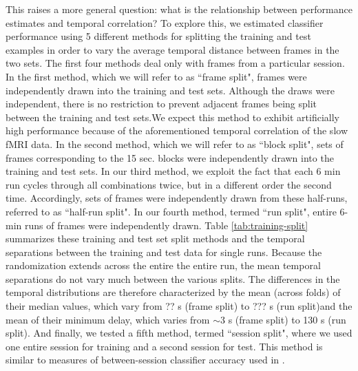 \documentclass[preprint,5p,authoryear]{elsarticle}
\begin{document}
This raises a more general question: what is the relationship between performance estimates and temporal correlation?
To explore this, we estimated classifier performance using 5 different methods for splitting the training and test examples in order to vary the average temporal distance between frames in the two sets. 
The first four methods deal only with frames from a particular session.
In the first method, which we will refer to as  ``frame split", frames were independently drawn into the training and test sets. 
Although the draws were independent, there is no restriction to prevent adjacent frames being split between the training and test sets.We expect this method to exhibit artificially high performance because of the aforementioned temporal correlation of the slow fMRI data.
In the second method, which we will refer to as ``block split", sets of frames corresponding to the 15 sec. blocks were independently drawn into the training and test sets.
In our third method, we exploit the fact that each 6 min run cycles through all combinations twice, but in a different order the second time.
Accordingly, sets of frames were independently drawn from these half-runs, referred to as ``half-run split". 
In our fourth method, termed ``run split", entire 6-min runs of frames were independently drawn. 
Table \ref{tab:training-split} summarizes these training and test set split methods and the temporal separations between the training and test data for single runs. Because the randomization extends across the entire the entire run, the mean temporal separations do not vary much between the various splits. The differences in the temporal distributions are therefore characterized by the mean (across folds) of their median values, which vary from ?? s (frame split) to ??? s (run split)and the mean of their minimum delay, which varies from $\sim$3 s (frame split) to 130 s (run split).
And finally, we tested a fifth method, termed ``session split", where we used one entire session for training and a second session for test.
This method is similar to measures of between-session classifier accuracy used in \citep{BetweenSessionAccuracy}.

\end{document}
